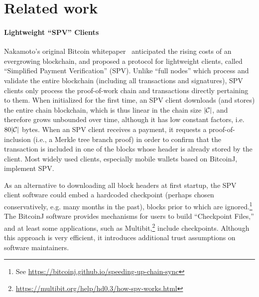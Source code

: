 \section{Related work}

\paragraph{Lightweight ``SPV'' Clients}
Nakamoto's original Bitcoin whitepaper~\cite{bitcoin} anticipated the rising costs of an evergrowing blockchain, and proposed a protocol for lightweight clients, called ``Simplified Payment Verification'' (SPV). Unlike ``full nodes'' which process and validate the entire blockchain (including all transactions and signatures), SPV clients only process the proof-of-work chain and transactions directly pertaining to them.
When initialized for the first time, an SPV client downloads (and stores) the
entire chain blockchain, which is thus linear in the chain size $|\mathcal{C}|$, and
therefore grows unbounded over time, although it has low constant factors, i.e.
$80|\mathcal{C}|$ bytes.
When an SPV client receives a payment, it requests a proof-of-inclusion (i.e., a Merkle tree branch proof) in order to confirm that the transaction is included in one of the blocks whose header is already stored by the client.
Most widely used clients, especially mobile wallets based on BitcoinJ, implement SPV.


As an alternative to downloading all block headers at first startup, the SPV client software could embed a hardcoded checkpoint (perhaps chosen conservatively, e.g. many months in the past), blocks prior to which are ignored.\footnote{See \url{https://bitcoinj.github.io/speeding-up-chain-sync}} The BitcoinJ software provides mechanisms for users to build ``Checkpoint Files,'' and at least some applications, such as Multibit,\footnote{\url{https://multibit.org/help/hd0.3/how-spv-works.html}} include checkpoints. Although this approach is very efficient, it introduces additional trust assumptions on software maintainers.


